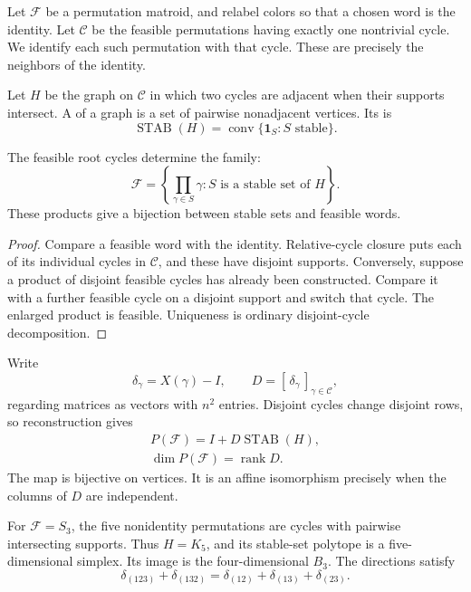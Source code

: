 Let $\mathcal F$ be a permutation matroid, and relabel colors so that
a chosen word is the identity. Let $\mathcal C$
be the feasible permutations having exactly one nontrivial cycle.
We identify each such permutation with that cycle. These are precisely
the neighbors of the identity.

Let $H$ be the graph on $\mathcal C$ in which two cycles are adjacent
when their supports intersect. A  of a graph is a set
of pairwise nonadjacent vertices. Its  is
\[
 \operatorname{STAB}(H)=
 \operatorname{conv}\{\mathbf1_S:S\text{ stable}\}.
\]

\begin{theorem}[Reconstruction]
The feasible root cycles determine the family:
\[
 \mathcal F=
 \left\{\prod_{\gamma\in S}\gamma:
 S\text{ is a stable set of }H\right\}.
\]
These products give a bijection between stable sets and feasible words.
\end{theorem}

\begin{proof}
Compare a feasible word with the identity. Relative-cycle closure puts
each of its individual cycles in $\mathcal C$, and these have disjoint
supports. Conversely, suppose a product of disjoint feasible cycles has
already been constructed. Compare it with a further feasible cycle on
a disjoint support and switch that cycle. The enlarged product is
feasible. Uniqueness is ordinary disjoint-cycle decomposition.
\end{proof}

Write
\[
 \delta_\gamma=X(\gamma)-I,
 \qquad D=[\,\delta_\gamma\,]_{\gamma\in\mathcal C},
\]
regarding matrices as vectors with $n^2$ entries.
Disjoint cycles change disjoint rows, so reconstruction gives
\[
 \begin{gathered}
 P(\mathcal F)=I+D\operatorname{STAB}(H),\\
 \dim P(\mathcal F)=\operatorname{rank}D.
 \end{gathered}
\]
The map is bijective on vertices. It is an affine isomorphism precisely
when the columns of $D$ are independent.

\begin{example}
For $\mathcal F=S_3$, the five nonidentity permutations are cycles
with pairwise intersecting supports. Thus $H=K_5$, and its stable-set
polytope is a five-dimensional simplex. Its image is the four-dimensional
$B_3$. The directions satisfy
\[
 \delta_{(123)}+\delta_{(132)}
 =\delta_{(12)}+\delta_{(13)}+\delta_{(23)}.
\]
\end{example}


